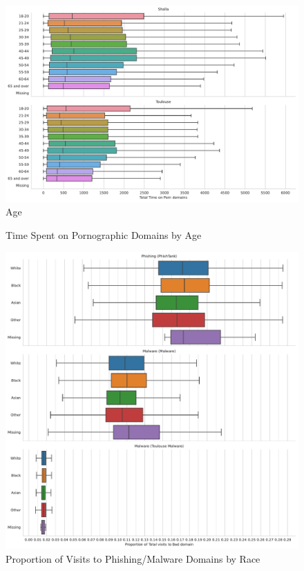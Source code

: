 \documentclass[12pt, letterpaper]{article}
\begin{document}
\begin{figure}[!htb]
  \centering
  \caption{Time Spent on Pornographic Domains by Age}
  \label{fig:total_time_porn_age}
  \includegraphics[width=\textwidth]{figs/total_time_porn_age.pdf}\\Age
\end{figure}

\begin{figure}[!htb]
  \centering
  \caption{Proportion of Visits to Phishing/Malware Domains by Race}
	\label{fig:prop_total_visits_phishing_malware_race}
	\includegraphics[width=\textwidth]{figs/prop_total_visits_phishing_malware_tl_race.pdf}
	\end{figure}
\end{document}
